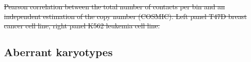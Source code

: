 \documentclass[a4,center,fleqn]{NAR}
\providecommand{\DIFdel}[1]{{\protect\color{red}\sout{#1}}}                      %
\providecommand{\DIFdelbegin}{} %
\providecommand{\DIFdelend}{} %
\providecommand{\DIFdelFL}[1]{\DIFdel{#1}} %
\begin{document}
\DIFdelbegin %
{%
\DIFdelFL{Pearson correlation between the total number of contacts per bin
and an independent estimation of the copy number (COSMIC). Left panel
T47D breast cancer cell line, right panel K562 leukemia cell line.}}
\DIFdelend %



\subsection{Aberrant karyotypes}
\end{document}
